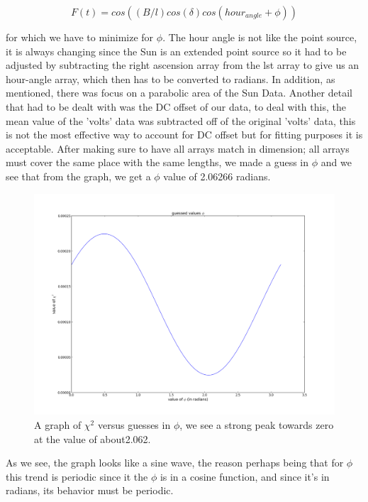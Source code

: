 \documentclass[12 pt]{article}
\begin{document}
\begin{equation}
F(t) = cos((B/l)cos(\delta)cos(hour_{angle} + \phi))
\end{equation}
 
for which we have to minimize for $\phi$. The hour angle is not
like the point source, it is always changing since the Sun is an
extended point source so it had to be adjusted by
subtracting the right ascension array from the lst array to give us an
hour-angle array, which then has to be converted to radians. In addition,
as mentioned, there was focus on a parabolic area of the Sun
Data. Another detail that had to be dealt with was the DC offset of our
data, to deal with this, the mean value of the 'volts' data was
subtracted off of the original 'volts' data, this is not the most
effective way to account for DC offset but for fitting purposes it is acceptable. After making sure to have
all arrays match in dimension; all arrays must cover the same
place with the same lengths, we made a guess in $\phi$ and we see that
from the graph, we get a $\phi$ value of 2.06266 radians.

\begin{figure}[H]
\centering
\includegraphics[scale=0.45]{sunphi.png}
\caption{A graph of $\chi^2$ versus guesses in $\phi$, we see a strong
  peak towards zero at the value of about2.062.}
\label{sunphi}
\end{figure}
 
As we see, the graph looks like a sine wave, the reason perhaps being that
for $\phi$ this trend is periodic since it the $\phi$ is in a cosine function, and
since it's in radians, its behavior must be periodic. 
\end{document}
